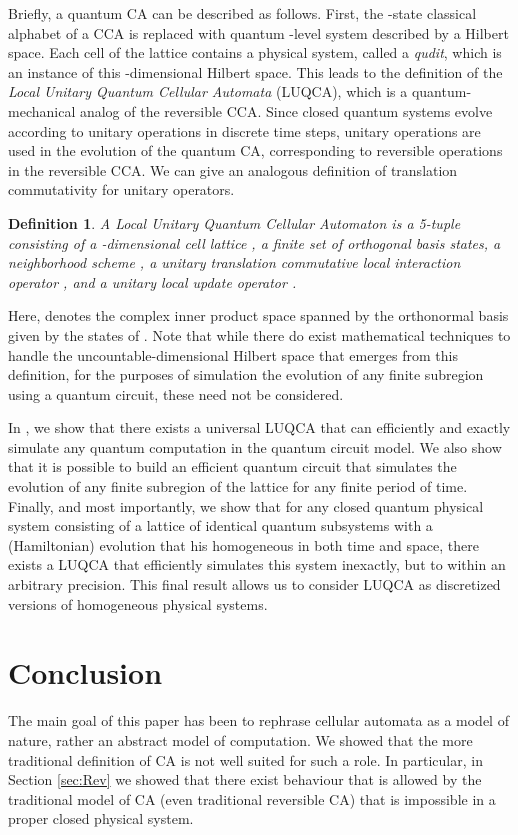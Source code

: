 \documentclass{jca}
\newtheorem{definition}{Definition}
\begin{document}
Briefly, a quantum CA can be described as follows.
First, the -state classical alphabet  of a CCA is replaced with quantum -level system described by a Hilbert space.
Each cell of the lattice contains a physical system, called a \emph{qudit}, which is an instance of this -dimensional Hilbert space.
This leads to the definition of the \emph{Local Unitary Quantum Cellular Automata} (LUQCA), which is a quantum-mechanical analog of the reversible CCA.
Since closed quantum systems evolve according to unitary operations in discrete time steps,  unitary operations are used in the evolution of the quantum CA, corresponding to reversible operations in the reversible CCA.
We can give an analogous definition of translation commutativity for unitary operators.
\begin{definition}
A Local Unitary Quantum Cellular Automaton is a 5-tuple  consisting of a -dimensional cell lattice , a finite set  of  orthogonal basis states, a neighborhood scheme , a unitary translation commutative local interaction operator , and a unitary local update operator .
\end{definition}
Here,  denotes the complex inner product space spanned by the orthonormal basis given by the states of .
Note that while there do exist mathematical techniques to handle the uncountable-dimensional Hilbert space that emerges from this definition\cite{neumanninfinite}, for the purposes of simulation the evolution of any finite subregion using a quantum circuit, these need not be considered.

In , we show that there exists a universal LUQCA that can efficiently and exactly simulate any quantum computation in the quantum circuit model.
We also show that it is possible to build an efficient quantum circuit that simulates the evolution of any finite subregion of the lattice for any finite period of time.
Finally, and most importantly, we show that for any closed quantum physical system consisting of a lattice of identical quantum subsystems with a (Hamiltonian) evolution that his homogeneous in both time and space, there exists a LUQCA that efficiently simulates this system inexactly, but to within an arbitrary precision.
This final result allows us to consider LUQCA as discretized versions of homogeneous physical systems.


\section{Conclusion}


The main goal of this paper has been to rephrase cellular automata as a model of nature, rather an abstract model of computation.
We showed that the more traditional definition of CA is not well suited for such a role.
In particular, in Section \ref{sec:Rev} we showed that there exist behaviour that is allowed by the traditional model of CA (even traditional reversible CA) that is impossible in a proper closed physical system.
\end{document}
